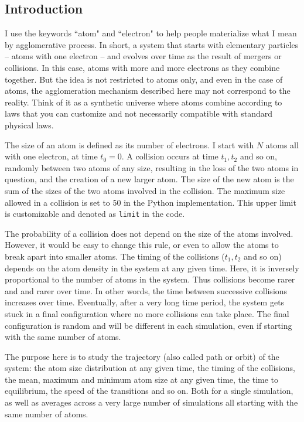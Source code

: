 \documentclass[oneside,10pt]{book}
\begin{document}
\subsection{Introduction}\label{dk6fb}\label{twql98}

I use the keywords ``atom" and ``electron" to help people materialize what I mean by agglomerative process. In short, a system
 that starts with elementary particles -- atoms with one electron -- and evolves over time as the result of mergers or
 collisions. In this case, atoms with more and more electrons as they combine together.  But the idea is not restricted to atoms only, and even in the case of atoms, the agglomeration mechanism described here may not correspond to the reality. Think of it as a synthetic universe where atoms combine according to laws that you can customize and not necessarily compatible
 with standard physical laws.

The size of an atom is defined as its number of electrons. I start with $N$ atoms all with one electron, at time $t_0=0$. A collision occurs at time $t_1,t_2$ and so on, randomly between two atoms of any size, resulting in the loss of the two atoms in question, and the creation of a new larger atom.
 The size of the new atom is the sum of the sizes of the two atoms involved in the collision. The maximum size allowed in a collision is set to 50 in the Python implementation. This upper limit is customizable and denoted as \texttt{limit} in the code.

The probability of a collision does not depend on the size of the atoms involved. However, it would be easy to change this rule, or even to allow the atoms to break apart into smaller atoms. The timing of the collisions ($t_1,t_2$ and so on) depends on the atom density in the system at any given time. Here, it is inversely proportional to the number of atoms
 in the system. Thus collisions become rarer and and rarer over time. In other words, the time between successive collisions increases over time.  Eventually, after a very long time period, the system gets stuck in a final configuration where no more collisions can take place. The final configuration is random and will be different in each simulation, even if starting with the same number of atoms.

The purpose here is to study the trajectory (also called path or orbit) of the system: the atom size distribution at any given time, the timing of the collisions, the mean, maximum and minimum atom size at any given time, the time to equilibrium, the speed of the transitions and so on. Both for a single simulation, as well as averages across a very large number of simulations  all starting with the same number of atoms.
\end{document}
